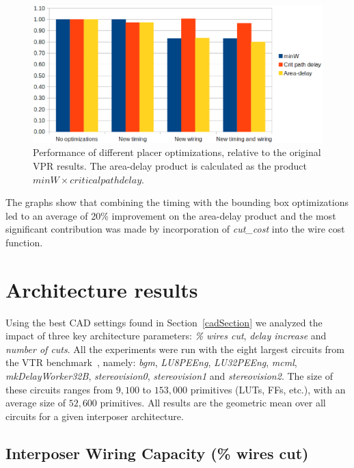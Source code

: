 \documentclass{sig-alternate-2013}
\begin{document}
\begin{figure}[!htbp]
\centering
\includegraphics[width=\linewidth]{comparison_bars_relative.eps}
\caption{Performance of different placer optimizations, relative to the original VPR results. The area-delay product is calculated as the product $minW \times critical path delay.$}
\label{fig:comparison_bars}
\end{figure}

The graphs show that combining the timing with the bounding box optimizations led to an average of 20\% improvement on the area-delay product and the most significant contribution was made by incorporation of \textit{cut\_cost} into the wire cost function.


\section{Architecture results}
\label{resultsSection}

Using the best CAD settings found in Section~\ref{cadSection} we analyzed the impact of three key architecture parameters:  \textit{\% wires cut}, \textit{delay increase} and \textit{number of cuts}. All the experiments were run with the eight largest circuits from the VTR benchmark~\cite{vtr2012}, namely: \textit{bgm}, \textit{LU8PEEng}, \textit{LU32PEEng}, \textit{mcml}, \textit{mkDelayWorker32B}, \textit{stereovision0}, \textit{stereovision1} and \textit{stereovision2}. The size of these circuits ranges from $9,100$ to $153,000$ primitives (LUTs, FFs, etc.), with an average size of $52,600$ primitives. All results are the geometric mean over all circuits for a given interposer architecture.

\subsection{Interposer Wiring Capacity (\% wires cut)}
\end{document}
